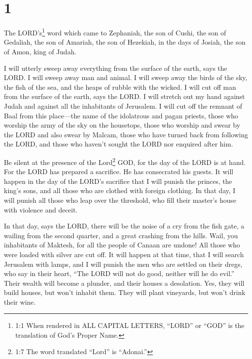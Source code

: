 \hypertarget{section}{%
\section{1}\label{section}}

 The LORD's\footnote{1:1 When rendered in ALL CAPITAL
  LETTERS, ``LORD'' or ``GOD'' is the translation of God's Proper Name.}
word which came to Zephaniah, the son of Cushi, the son of Gedaliah, the
son of Amariah, the son of Hezekiah, in the days of Josiah, the son of
Amon, king of Judah.

 I will utterly sweep away everything from the surface of
the earth, says the LORD.  I will sweep away man and animal.
I will sweep away the birds of the sky, the fish of the sea, and the
heaps of rubble with the wicked. I will cut off man from the surface of
the earth, says the LORD.  I will stretch out my hand
against Judah and against all the inhabitants of Jerusalem. I will cut
off the remnant of Baal from this place---the name of the idolatrous and
pagan priests,  those who worship the army of the sky on the
housetops, those who worship and swear by the LORD and also swear by
Malcam,  those who have turned back from following the LORD,
and those who haven't sought the LORD nor enquired after him.

 Be silent at the presence of the Lord\footnote{1:7 The word
  translated ``Lord'' is ``Adonai.''} GOD, for the day of the LORD is at
hand. For the LORD has prepared a sacrifice. He has consecrated his
guests.  It will happen in the day of the LORD's sacrifice
that I will punish the princes, the king's sons, and all those who are
clothed with foreign clothing.  In that day, I will punish
all those who leap over the threshold, who fill their master's house
with violence and deceit.

 In that day, says the LORD, there will be the noise of a
cry from the fish gate, a wailing from the second quarter, and a great
crashing from the hills.  Wail, you inhabitants of Maktesh,
for all the people of Canaan are undone! All those who were loaded with
silver are cut off.  It will happen at that time, that I
will search Jerusalem with lamps, and I will punish the men who are
settled on their dregs, who say in their heart, ``The LORD will not do
good, neither will he do evil.''  Their wealth will become
a plunder, and their houses a desolation. Yes, they will build houses,
but won't inhabit them. They will plant vineyards, but won't drink their
wine.

